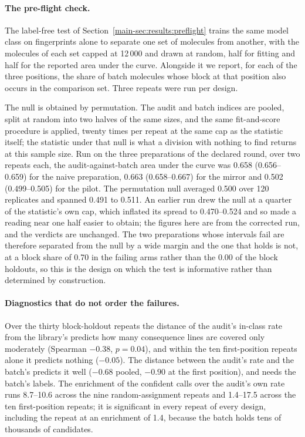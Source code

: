 \documentclass[10pt]{article}
\begin{document}
\paragraph{The pre-flight check.} The label-free test of Section~\ref{main-sec:results:preflight} trains the same model class on fingerprints alone to separate one set of molecules from another, with the molecules of each set capped at 12\,000 and drawn at random, half for fitting and half for the reported area under the curve. Alongside it we report, for each of the three positions, the share of batch molecules whose block at that position also occurs in the comparison set. Three repeats were run per design.

The null is obtained by permutation. The audit and batch indices are pooled, split at random into two halves of the same sizes, and the same fit-and-score procedure is applied, twenty times per repeat at the same cap as the statistic itself; the statistic under that null is what a division with nothing to find returns at this sample size. Run on the three preparations of the declared round, over two repeats each, the audit-against-batch area under the curve was 0.658 (0.656--0.659) for the naive preparation, 0.663 (0.658--0.667) for the mirror and 0.502 (0.499--0.505) for the pilot. The permutation null averaged 0.500 over 120 replicates and spanned 0.491 to 0.511. An earlier run drew the null at a quarter of the statistic's own cap, which inflated its spread to 0.470--0.524 and so made a reading near one half easier to obtain; the figures here are from the corrected run, and the verdicts are unchanged. The two preparations whose intervals fail are therefore separated from the null by a wide margin and the one that holds is not, at a block share of 0.70 in the failing arms rather than the 0.00 of the block holdouts, so this is the design on which the test is informative rather than determined by construction.

\paragraph{Diagnostics that do not order the failures.} Over the thirty block-holdout repeats
the distance of the audit's in-class rate from the library's predicts how many consequence lines
are covered only moderately (Spearman $-0.38$, $p=0.04$), and within the ten first-position
repeats alone it predicts nothing ($-0.05$). The distance between the audit's rate and the
batch's predicts it well ($-0.68$ pooled, $-0.90$ at the first position), and needs the batch's
labels. The enrichment of the confident calls over the audit's own rate runs 8.7--10.6 across the
nine random-assignment repeats and 1.4--17.5 across the ten first-position repeats; it is
significant in every repeat of every design, including the repeat at an enrichment of 1.4,
because the batch holds tens of thousands of candidates.
\end{document}
